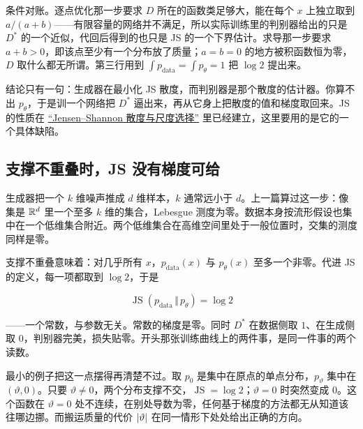 条件对账。逐点优化那一步要求 \(D\) 所在的函数类足够大，能在每个 \(x\) 上独立取到 \(a/(a+b)\)——有限容量的网络并不满足，所以实际训练里的判别器给出的只是 \(D^\ast\) 的一个近似，代回后得到的也只是 JS 的一个下界估计。求导那一步要求 \(a+b>0\)，即该点至少有一个分布放了质量；\(a=b=0\) 的地方被积函数恒为零，\(D\) 取什么都无所谓。第三行用到 \(\int p_{\text{data}}=\int p_\theta=1\) 把 \(\log 2\) 提出来。

结论只有一句：生成器在最小化 JS 散度，而判别器是那个散度的估计器。你算不出 \(p_\theta\)，于是训一个网络把 \(D^\ast\) 逼出来，再从它身上把散度的值和梯度取回来。JS 的性质在 \hyperref[sec:07-Information-Theory/03-Divergences/03]{``Jensen--Shannon 散度与尺度选择''} 里已经建立，这里要用的是它的一个具体缺陷。

\subsection{支撑不重叠时，JS 没有梯度可给}

生成器把一个 \(k\) 维噪声推成 \(d\) 维样本，\(k\) 通常远小于 \(d\)。上一篇算过这一步：像集是 \(\mathbb{R}^d\) 里一个至多 \(k\) 维的集合，Lebesgue 测度为零。数据本身按流形假设也集中在一个低维集合附近。两个低维集合在高维空间里处于一般位置时，交集的测度同样是零。

支撑不重叠意味着：对几乎所有 \(x\)，\(p_{\text{data}}(x)\) 与 \(p_\theta(x)\) 至多一个非零。代进 JS 的定义，每一项都取到 \(\log 2\)，于是

\[
\operatorname{JS}(p_{\text{data}}\,\Vert\,p_\theta)=\log 2
\]

——一个常数，与参数无关。常数的梯度是零。同时 \(D^\ast\) 在数据侧取 \(1\)、在生成侧取 \(0\)，判别器完美，损失贴零。开头那张训练曲线上的两件事，是同一件事的两个读数。

最小的例子把这一点摆得再清楚不过。取 \(p_0\) 是集中在原点的单点分布，\(p_\vartheta\) 集中在 \((\vartheta,0)\)。只要 \(\vartheta\neq0\)，两个分布支撑不交，\(\operatorname{JS}=\log 2\)；\(\vartheta=0\) 时突然变成 \(0\)。这个函数在 \(\vartheta=0\) 处不连续，在别处导数为零，任何基于梯度的方法都无从知道该往哪边挪。而搬运质量的代价 \(\left|\vartheta\right|\) 在同一情形下处处给出正确的方向。

